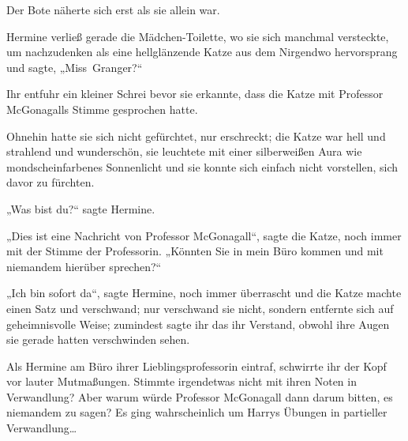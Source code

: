
Der Bote näherte sich erst als sie allein war.

Hermine verließ gerade die Mädchen-Toilette, wo sie sich manchmal versteckte, um nachzudenken als eine hellglänzende Katze aus dem Nirgendwo hervorsprang und sagte, „Miss~Granger?“

Ihr entfuhr ein kleiner Schrei bevor sie erkannte, dass die Katze mit Professor McGonagalls Stimme gesprochen hatte.

Ohnehin hatte sie sich nicht gefürchtet, nur erschreckt; die Katze war hell und strahlend und wunderschön, sie leuchtete mit einer silberweißen Aura wie mondscheinfarbenes Sonnenlicht und sie konnte sich einfach nicht vorstellen, sich davor zu fürchten.

„Was bist du?“ sagte Hermine.

„Dies ist eine Nachricht von Professor McGonagall“, sagte die Katze, noch immer mit der Stimme der Professorin. „Könnten Sie in mein Büro kommen und mit niemandem hierüber sprechen?“

„Ich bin sofort da“, sagte Hermine, noch immer überrascht und die Katze machte einen Satz und verschwand; nur verschwand sie nicht, sondern entfernte sich auf geheimnisvolle Weise; zumindest sagte ihr das ihr Verstand, obwohl ihre Augen sie gerade hatten verschwinden sehen.

Als Hermine am Büro ihrer Lieblingsprofessorin eintraf, schwirrte ihr der Kopf vor lauter Mutmaßungen. Stimmte irgendetwas nicht mit ihren Noten in Verwandlung? Aber warum würde Professor McGonagall dann darum bitten, es niemandem zu sagen? Es ging wahrscheinlich um Harrys Übungen in partieller Verwandlung…

